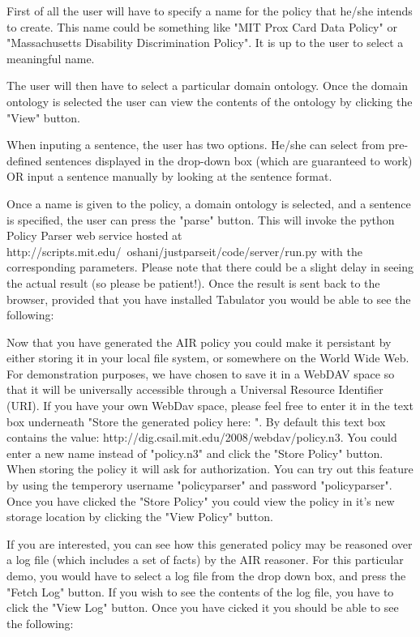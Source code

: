 \documentclass{llncs}
\begin{document}
First of all the user will have to specify a name for the policy that he/she intends to create. This name could be something like "MIT Prox Card Data Policy" or "Massachusetts Disability Discrimination Policy". It is up to the user to select a meaningful name.

The user will then have to select a particular domain ontology. Once the domain ontology is selected the user can view the contents of the ontology by clicking the "View" button. 

When inputing a sentence, the user has two options. He/she can select from pre-defined sentences displayed in the drop-down box (which are guaranteed to work) OR input a sentence manually by looking at the sentence format.

Once a name is given to the policy, a domain ontology is selected, and a sentence is specified, the user can press the "parse" button. This will invoke the python Policy Parser web service hosted at http://scripts.mit.edu/~oshani/justparseit/code/server/run.py with the corresponding parameters. Please note that there could be a slight delay in seeing the actual result (so please be patient!). Once the result is sent back to the browser, provided that you have installed Tabulator you would be able to see the following:

Now that you have generated the AIR policy you could make it persistant by either storing it in your local file system, or somewhere on the World Wide Web. For demonstration purposes, we have chosen to save it in a WebDAV space so that it will be universally accessible through a Universal Resource Identifier (URI). If you have your own WebDav space, please feel free to enter it in the text box underneath "Store the generated policy here: ". By default this text box contains the value:
http://dig.csail.mit.edu/2008/webdav/policy.n3. 
You could enter a new name instead of "policy.n3" and click the "Store Policy" button. When storing the policy it will ask for authorization. You can try out this feature by using the temperory username "policyparser" and password "policyparser". Once you have clicked the "Store Policy" you could view the policy in it's new storage location by clicking the "View Policy" button.

If you are interested, you can see how this generated policy may be reasoned over a log file (which includes a set of facts) by the AIR reasoner. For this particular demo, you would have to select a log file from the drop down box, and press the "Fetch Log" button. If you wish to see the contents of the log file, you have to click the "View Log" button. Once you have cicked it you should be able to see the following:
\end{document}
